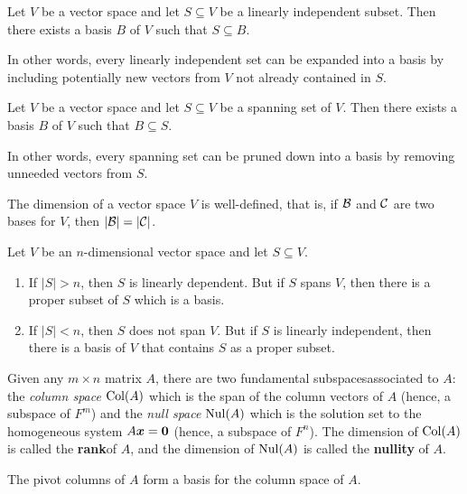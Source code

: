 \begin{Thm} Let $V$ be a vector space and let $S\subseteq V$ be a linearly independent subset. Then there exists a basis $B$ of $V$ such that $S\subseteq B$. 
\end{Thm}
In other words, every linearly independent set can be expanded into a basis by including potentially new vectors from $V$ not already contained in $S$.

\begin{Thm} Let $V$ be a vector space and let $S\subseteq V$ be a spanning set of $V$. Then there exists a basis $B$ of $V$ such that $B\subseteq S$.
\end{Thm}
 
In other words, every spanning set can be pruned down into a basis by removing unneeded vectors from $S$.

\begin{Thm} The dimension of a vector space $V$ is well-defined, that is, if $\mathcal{B}$ and $\mathcal{C}$ are two bases for $V$, then $|\mathcal{B}|=|\mathcal{C}|$.
\end{Thm}

\begin{Thm} Let $V$ be an $n$-dimensional vector space and let $S\subseteq V$.
\begin{enumerate}[!THM!, start=1]
\item If $|S|> n$, then $S$ is linearly dependent. But if $S$ spans $V$, then there is a proper subset of $S$ which is a basis. 
\item If $|S|<n$, then $S$ does not span $V$. But if $S$ is linearly independent, then there is a basis of $V$ that contains $S$ as a proper subset.
\end{enumerate}
\end{Thm}

Given any $m\times n$ matrix $A$, there are two fundamental subspaces\footnotemark[8] associated to $A$: the \emph{column space} $\operatorname{Col}(A)$ which is the span of the column vectors of $A$ (hence, a subspace of $F^m$) and the \emph{null space} $\operatorname{Nul}(A)$ which is the solution set to the homogeneous system $A\boldsymbol x = \boldsymbol 0$ (hence, a subspace of $F^n$). The dimension of $\operatorname{Col}(A)$ is called the \textbf{rank}\footnotemark[3] of $A$, and the dimension of $\operatorname{Nul}(A)$ is called the \textbf{nullity} of $A$.\\

\begin{Thm}\label{thm:columnrank} The pivot columns of $A$ form a basis for the column space of $A$.
\end{Thm}

